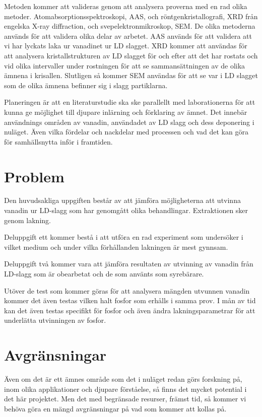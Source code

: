 \documentclass{article}
\begin{document}
Metoden kommer att valideras genom att analysera proverna med en rad olika metoder. Atomabsorptionsspektroskopi, AAS, och röntgenkristallografi, XRD från engelska X-ray diffraction, och svepelektronmikroskop, SEM. De olika metoderna används för att validera olika delar av arbetet. AAS används för att validera att vi har lyckats laka ur vanadinet ur LD slagget. XRD kommer att användas för att analysera kristallstrukturen av LD slagget för och efter att det har rostats och vid olika intervaller under rostningen för att se sammansättningen av de olika ämnena i krisallen. Slutligen så kommer SEM användas för att se var i LD slagget som de olika ämnena befinner sig i slagg partiklarna. 

Planeringen är att en literaturstudie ska ske parallellt med laborationerna för att kunna ge möjlighet till djupare inlärning och förklaring av ämnet. Det innebär användnings områden av vanadin, användadet av LD slagg och dess deponering i nuläget. Även vilka fördelar och nackdelar med processen och vad det kan göra för samhällsnytta inför i framtiden. 

\section{Problem} 
Den huvudsakliga uppgiften består av att jämföra möjligheterna att utvinna vanadin ur LD-slagg som har genomgått olika behandlingar. Extraktionen sker genom lakning.

Deluppgift ett kommer bestå i att utföra en rad experiment som undersöker i vilket medium och under vilka förhållanden lakningen är mest gynnsam.

Deluppgift två kommer vara att jämföra resultaten av utvinning av vanadin från LD-slagg som är obearbetat och de som använts som syrebärare.

Utöver de test som kommer göras för att analysera mängden utvunnen vanadin kommer det även testas vilken halt fosfor som erhålls i samma prov.
I mån av tid kan det även testas specifikt för fosfor och även ändra lakningsparametrar för att underlätta utvinningen av fosfor.
\section{Avgränsningar}
Även om det är ett ämnes område som det i nuläget redan görs forskning på, inom olika applikationer och djupare förståelse, så finns det mycket potential i det här projektet. Men det med begränsade resurser, främst tid, så kommer vi behöva göra en mängd avgränsningar på vad som kommer att kollas på. 
\end{document}
